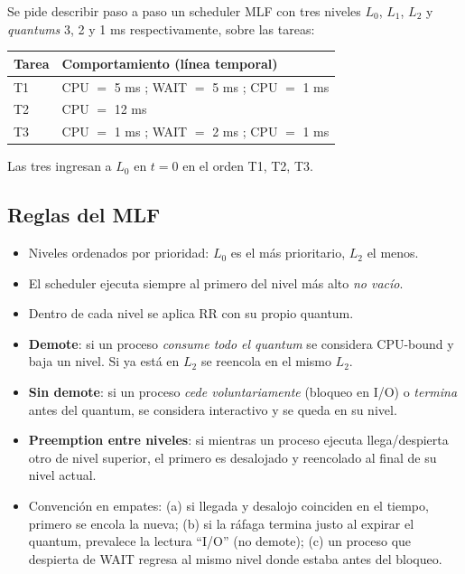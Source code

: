 \documentclass[11pt,a4paper]{article}
\begin{document}
Se pide describir paso a paso un scheduler MLF con tres niveles
$L_0$, $L_1$, $L_2$ y \emph{quantums} 3, 2 y 1 ms respectivamente,
sobre las tareas:

\begin{center}
\small
\begin{tabular}{@{}lp{8cm}@{}}
\toprule
Tarea & Comportamiento (línea temporal) \\
\midrule
T1 & CPU $=$ 5 ms ; WAIT $=$ 5 ms ; CPU $=$ 1 ms \\
T2 & CPU $=$ 12 ms \\
T3 & CPU $=$ 1 ms ; WAIT $=$ 2 ms ; CPU $=$ 1 ms \\
\bottomrule
\end{tabular}
\end{center}

Las tres ingresan a $L_0$ en $t = 0$ en el orden T1, T2, T3.

\subsection*{Reglas del MLF}

\begin{itemize}[leftmargin=*,nosep]
    \item Niveles ordenados por prioridad: $L_0$ es el más
        prioritario, $L_2$ el menos.
    \item El scheduler ejecuta siempre al primero del nivel más alto
        \emph{no vacío}.
    \item Dentro de cada nivel se aplica RR con su propio quantum.
    \item \textbf{Demote}: si un proceso \emph{consume todo el
        quantum} se considera CPU-bound y baja un nivel. Si ya está
        en $L_2$ se reencola en el mismo $L_2$.
    \item \textbf{Sin demote}: si un proceso \emph{cede
        voluntariamente} (bloqueo en I/O) o \emph{termina} antes del
        quantum, se considera interactivo y se queda en su nivel.
    \item \textbf{Preemption entre niveles}: si mientras un proceso
        ejecuta llega/despierta otro de nivel superior, el primero es
        desalojado y reencolado al final de su nivel actual.
    \item Convención en empates: (a) si llegada y desalojo coinciden
        en el tiempo, primero se encola la nueva; (b) si la ráfaga
        termina justo al expirar el quantum, prevalece la lectura
        ``I/O'' (no demote); (c) un proceso que despierta de WAIT
        regresa al mismo nivel donde estaba antes del bloqueo.
\end{itemize}
\end{document}

